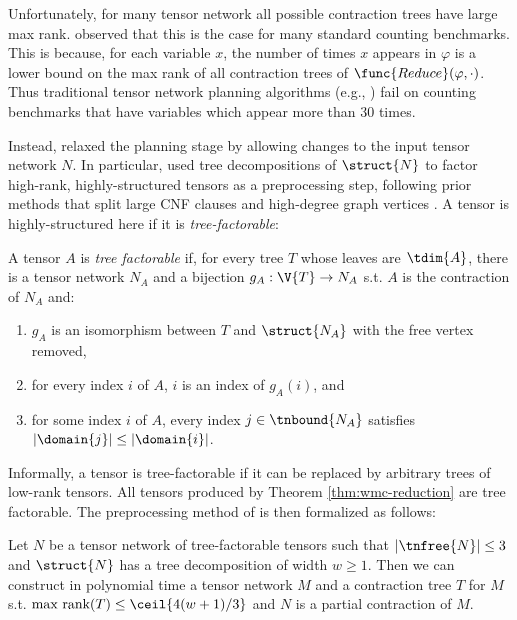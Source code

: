 Unfortunately, for many tensor network all possible contraction trees have large max rank. \cite{DDV19} observed that this is the case for many standard counting benchmarks. This is because, for each variable $x$, the number of times $x$ appears in $\varphi$ is a lower bound on the max rank of all contraction trees of $\func{Reduce}(\varphi, \cdot)$. Thus traditional tensor network planning algorithms (e.g., \cite{DFGHSW18,KCMR18,MS08}) fail on counting benchmarks that have variables which appear more than $30$ times. 

Instead, \cite{DDV19} relaxed the planning stage by allowing changes to the input tensor network $N$. In particular, \cite{DDV19} used tree decompositions of $\struct{N}$ to factor high-rank, highly-structured tensors as a preprocessing step, following prior methods that split large CNF clauses \cite{SS10_2} and high-degree graph vertices \cite{oliveira18,MS11}. A tensor is highly-structured here if it is \emph{tree-factorable}:
\begin{definition} \label{def:tree-factorable}
A tensor $A$ is \emph{tree factorable} if, for every tree $T$ whose leaves are $\tdim{A}$, there is a tensor network $N_A$ and a bijection $g_A: \V{T} \rightarrow N_A$ s.t. $A$ is the contraction of $N_A$ and:
\begin{enumerate}\itemsep0em 
\item $g_A$ is an isomorphism between $T$ and $\struct{N_A}$ with the free vertex removed,
\item for every index $i$ of $A$, $i$ is an index of $g_A(i)$, and
\item for some index $i$ of $A$, every index $j \in \tnbound{N_A}$ satisfies $|\domain{j}| \leq |\domain{i}|$. %
\end{enumerate}
\end{definition}
Informally, a tensor is tree-factorable if it can be replaced by arbitrary trees of low-rank tensors. All tensors produced by Theorem \ref{thm:wmc-reduction} are tree factorable. 
The preprocessing method of \cite{DDV19} is then formalized as follows:
\begin{theorem} \label{thm:factorable-tree}
Let $N$ be a tensor network of tree-factorable tensors such that $|\tnfree{N}| \leq 3$ and $\struct{N}$ has a tree decomposition of width $w \geq 1$. Then we can construct in polynomial time a tensor network $M$ and a contraction tree $T$ for $M$ s.t. $\text{max rank}(T) \leq \ceil{4(w+1)/3}$ and $N$ is a partial contraction of $M$.
\end{theorem}

